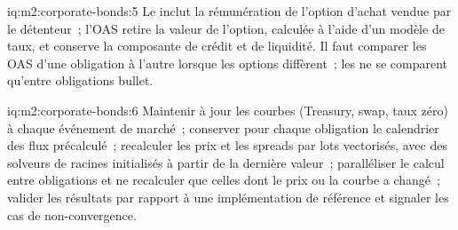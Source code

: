 \begin{solution}{iq:m2:corporate-bonds:5}
Le  inclut la rémunération de l'option d'achat vendue par le détenteur~; l'OAS retire
la valeur de l'option, calculée à l'aide d'un modèle de taux, et conserve la composante de crédit et de liquidité.
Il faut comparer les OAS d'une obligation à l'autre lorsque les options diffèrent~; les  ne se comparent qu'entre obligations bullet.
\end{solution}

\begin{solution}{iq:m2:corporate-bonds:6}
Maintenir à jour les courbes (Treasury, swap, taux zéro) à chaque événement de marché~; conserver
pour chaque obligation le calendrier des flux précalculé~; recalculer les prix et les spreads par lots vectorisés,
avec des solveurs de racines initialisés à partir de la dernière valeur~; paralléliser le calcul
entre obligations et ne recalculer que celles dont le prix ou la courbe a changé~; valider
les résultats par rapport à une implémentation de référence et signaler les cas de non-convergence.
\end{solution}
